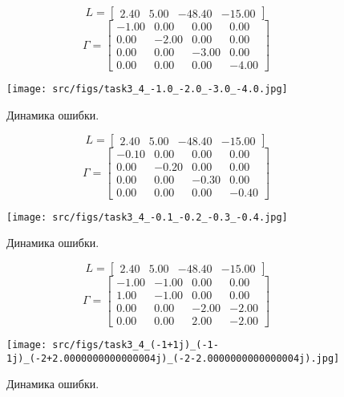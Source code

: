 \[L = \begin{bmatrix}
        2.40 &  5.00 & -48.40 & -15.00
      \end{bmatrix}\]
      \[\Gamma = \begin{bmatrix}
       -1.00 &  0.00 &  0.00 &  0.00\\
        0.00 & -2.00 &  0.00 &  0.00\\
        0.00 &  0.00 & -3.00 &  0.00\\
        0.00 &  0.00 &  0.00 & -4.00
      \end{bmatrix}\]
\begin{figure}[ht!]
        \centering
        \texttt{[image: src/figs/task3\_4\_-1.0\_-2.0\_-3.0\_-4.0.jpg]}
        \caption{Динамика ошибки.}
        \label{fig:task3_4_1.jpg}
\end{figure}
\FloatBarrier
      \[L = \begin{bmatrix}
        2.40 &  5.00 & -48.40 & -15.00
      \end{bmatrix}\]
      \[\Gamma = \begin{bmatrix}
       -0.10 &  0.00 &  0.00 &  0.00\\
        0.00 & -0.20 &  0.00 &  0.00\\
        0.00 &  0.00 & -0.30 &  0.00\\
        0.00 &  0.00 &  0.00 & -0.40
      \end{bmatrix}\]
\begin{figure}[ht!]
        \centering
        \texttt{[image: src/figs/task3\_4\_-0.1\_-0.2\_-0.3\_-0.4.jpg]}
        \caption{Динамика ошибки.}
        \label{fig:task3_4_2.jpg}
\end{figure}
\FloatBarrier
      \[L = \begin{bmatrix}
        2.40 &  5.00 & -48.40 & -15.00
      \end{bmatrix}\]
      \[\Gamma = \begin{bmatrix}
       -1.00 & -1.00 &  0.00 &  0.00\\
        1.00 & -1.00 &  0.00 &  0.00\\
        0.00 &  0.00 & -2.00 & -2.00\\
        0.00 &  0.00 &  2.00 & -2.00
      \end{bmatrix}\]
\begin{figure}[ht!]
        \centering
        \texttt{[image: src/figs/task3\_4\_(-1+1j)\_(-1-1j)\_(-2+2.0000000000000004j)\_(-2-2.0000000000000004j).jpg]}
        \caption{Динамика ошибки.}
        \label{fig:task3_4_3.jpg}
\end{figure}
\FloatBarrier

